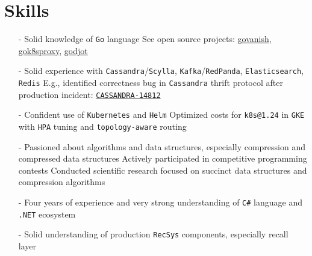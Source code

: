 \documentclass[10pt,a4paper]{article}
\begin{document}
\setlength{\parindent}{10pt}

\section{Skills}
\begin{itemize}
\vspace{1mm}
\item[-] Solid knowledge of \texttt{Go} language
\vspace{-1mm}
\subitem{$\bullet$} See open source projects: \href{https://github.com/sivukhin/govanish}{govanish}, \href{https://github.com/sivukhin/gok8sproxy}{gok8sproxy}, \href{https://github.com/sivukhin/godjot}{godjot}
\item[-] Solid experience with \texttt{Cassandra}/\texttt{Scylla}, \texttt{Kafka}/\texttt{RedPanda}, \texttt{Elasticsearch}, \texttt{Redis}
\vspace{-1mm}
\subitem{$\bullet$} E.g., identified correctness bug in \texttt{Cassandra} thrift protocol after production incident: \href{https://issues.apache.org/jira/browse/CASSANDRA-14812?page=com.atlassian.jira.plugin.system.issuetabpanels%3Acomment-tabpanel&focusedCommentId=16848873#comment-16848873}{\texttt{CASSANDRA-14812}}
\item[-] Confident use of \texttt{Kubernetes} and \texttt{Helm}
\vspace{-1mm}
\subitem{$\bullet$} Optimized costs for \texttt{k8s@1.24} in \texttt{GKE} with \texttt{HPA} tuning and \texttt{topology-aware} routing
\item[-] Passioned about algorithms and data structures, especially compression and compressed data structures
\vspace{-1mm}
\subitem{$\bullet$} Actively participated in competitive programming contests
\vspace{-1mm}
\subitem{$\bullet$} Conducted scientific research focused on succinct data structures and compression algorithms
\item[-] Four years of experience and very strong understanding of \texttt{C\#} language and \texttt{.NET} ecosystem
\item[-] Solid understanding of production \texttt{RecSys} components, especially recall layer
\end{itemize}
\end{document}
